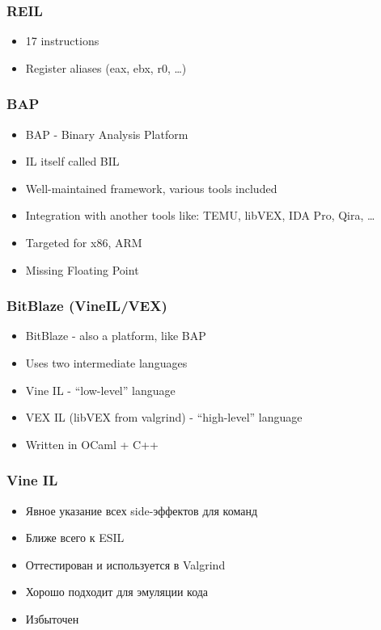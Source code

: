 \documentclass[10pt,pdf,utf8,english,compress,hyperref={unicode}]{beamer}
\begin{document}
\begin{frame}[fragile]
  \frametitle{REIL}
  \begin{itemize}
  \item 17 instructions
  \item Register aliases (eax, ebx, r0, \ldots) 
  \end{itemize}
\end{frame}

\begin{frame}[fragile]
  \frametitle{BAP}
  \begin{itemize}
  \item BAP - Binary Analysis Platform 
  \item IL itself called BIL
  \item Well-maintained framework, various tools included
  \item Integration with another tools like: TEMU, libVEX, IDA Pro, Qira, \ldots
  \item Targeted for x86, ARM
  \item Missing Floating Point
  \end{itemize}
\end{frame}

%

\begin{frame}[fragile]
  \frametitle{BitBlaze (VineIL/VEX)}
  \begin{itemize}
  \item BitBlaze  - also a platform, like BAP
  \item Uses two intermediate languages
  \item Vine IL - ``low-level'' language
  \item VEX IL (libVEX from valgrind) - ``high-level'' language
  \item Written in OCaml + C++
  \end{itemize}
\end{frame}

\begin{frame}[fragile]
  \frametitle{Vine IL  }
  \begin{itemize}
  \item Явное указание всех side-эффектов для команд
  \item Ближе всего к ESIL
  \item Оттестирован и используется в Valgrind
  \item Хорошо подходит для эмуляции кода
  \item Избыточен
  \end{itemize}
\end{frame}
\end{document}
